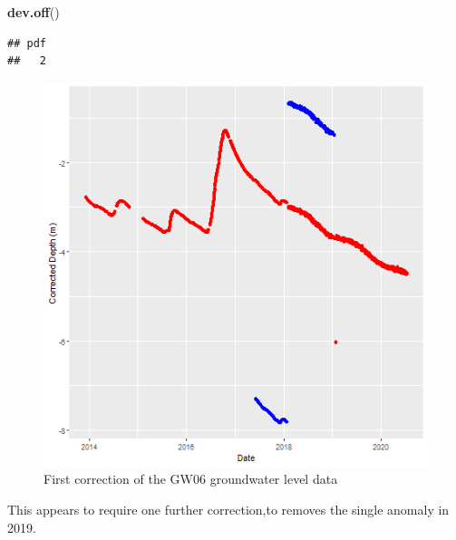 \documentclass[
]{article}
\newenvironment{Shaded}{\begin{snugshade}}{\end{snugshade}}
\newcommand{\AttributeTok}[1]{\textcolor[rgb]{0.13,0.29,0.53}{#1}}
\newcommand{\CommentTok}[1]{\textcolor[rgb]{0.56,0.35,0.01}{\textit{#1}}}
\newcommand{\DecValTok}[1]{\textcolor[rgb]{0.00,0.00,0.81}{#1}}
\newcommand{\FloatTok}[1]{\textcolor[rgb]{0.00,0.00,0.81}{#1}}
\newcommand{\FunctionTok}[1]{\textcolor[rgb]{0.13,0.29,0.53}{\textbf{#1}}}
\newcommand{\NormalTok}[1]{#1}
\newcommand{\OtherTok}[1]{\textcolor[rgb]{0.56,0.35,0.01}{#1}}
\newcommand{\SpecialCharTok}[1]{\textcolor[rgb]{0.81,0.36,0.00}{\textbf{#1}}}
\newcommand{\StringTok}[1]{\textcolor[rgb]{0.31,0.60,0.02}{#1}}
\begin{document}
\begin{Shaded}
\begin{Highlighting}[]
\FunctionTok{dev.off}\NormalTok{()}
\end{Highlighting}
\end{Shaded}

\begin{verbatim}
## pdf 
##   2
\end{verbatim}

\begin{figure}
\includegraphics[width=0.8\linewidth]{../Figures/GW06_firstcorrection} \caption{First correction of the GW06 groundwater level data}\label{fig:firstcorr-GW06}
\end{figure}

This appears to require one further correction,to removes the single
anomaly in 2019.

\begin{Shaded}
\end{Shaded}
\end{document}
